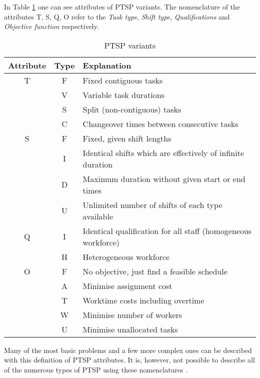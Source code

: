 In Table \ref{PTSP} one can see attributes of PTSP variants. The nomenclature of the attributes T, S, Q, O refer to the \textit{Task type}, \textit{Shift type}, \textit{Qualifications} and \textit{Objective function} respectively. 
\begin{table}[H]
\caption{PTSP variants}
\label{PTSP}
\begin{tabular}{|c|c|l|}
\hline
\textbf{Attribute} & \textbf{Type} & \textbf{Explanation} \\ \hline
T & F & Fixed contiguous tasks \\
& V & Variable task durations \\
& S & Split (non-contiguous) tasks \\
& C & Changeover times between consecutive tasks \\
\hline 
S & F & Fixed, given shift lengths \\
& I & Identical shifts which are effectively of infinite duration \\
& D & Maximum duration without given start or end times \\
& U & Unlimited number of shifts of each type available \\
\hline 
Q & I & Identical qualification for all staff (homogeneous workforce) \\
& H & Heterogeneous workforce \\
\hline 
O & F & No objective, just find a feasible schedule \\
& A & Minimise assignment cost \\
& T & Worktime costs including overtime \\
& W & Minimise number of workers \\
& U & Minimise unallocated tasks \\
\hline  

\end{tabular}
\end{table}

Many of the most basic problems and a few more complex ones can be described with this definition of PTSP attributes. It is, however, not possible to describe all of the numerous types of PTSP using these nomenclatures \cite{krishnamoorthy_2001}.

